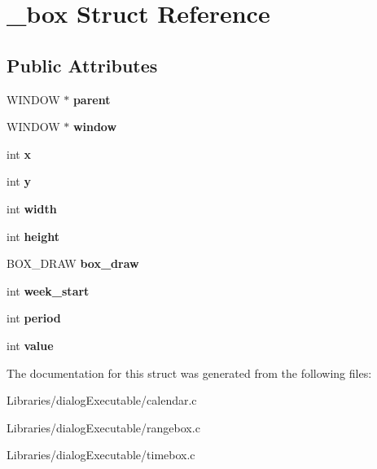 \hypertarget{struct__box}{}\section{\+\_\+box Struct Reference}
\label{struct__box}
\subsection*{Public Attributes}
\begin{DoxyCompactItemize}
\item 
W\+I\+N\+D\+OW $\ast$ {\bfseries parent}\hypertarget{struct__box_a31a06ad4a3eb0e5870d9f289661e4adc}{}\label{struct__box_a31a06ad4a3eb0e5870d9f289661e4adc}

\item 
W\+I\+N\+D\+OW $\ast$ {\bfseries window}\hypertarget{struct__box_af82d94fa8b77867b25801cd2cd933ff3}{}\label{struct__box_af82d94fa8b77867b25801cd2cd933ff3}

\item 
int {\bfseries x}\hypertarget{struct__box_ae40a9b37b6587721620da85255e1d84a}{}\label{struct__box_ae40a9b37b6587721620da85255e1d84a}

\item 
int {\bfseries y}\hypertarget{struct__box_aa0b25e97a846a412346cae4ca8219d0d}{}\label{struct__box_aa0b25e97a846a412346cae4ca8219d0d}

\item 
int {\bfseries width}\hypertarget{struct__box_a1a77dee766de46ca4032858b932fc135}{}\label{struct__box_a1a77dee766de46ca4032858b932fc135}

\item 
int {\bfseries height}\hypertarget{struct__box_a3a3232d1b518d9539b6f6e2b595cf8e6}{}\label{struct__box_a3a3232d1b518d9539b6f6e2b595cf8e6}

\item 
B\+O\+X\+\_\+\+D\+R\+AW {\bfseries box\+\_\+draw}\hypertarget{struct__box_ab0d062676108681e348c12d4892fb18c}{}\label{struct__box_ab0d062676108681e348c12d4892fb18c}

\item 
int {\bfseries week\+\_\+start}\hypertarget{struct__box_ad271fe24d6f9f0fcf4d0850adbfb821a}{}\label{struct__box_ad271fe24d6f9f0fcf4d0850adbfb821a}

\item 
int {\bfseries period}\hypertarget{struct__box_a2cb2a98abc4a4ac798381ca184fcdfc0}{}\label{struct__box_a2cb2a98abc4a4ac798381ca184fcdfc0}

\item 
int {\bfseries value}\hypertarget{struct__box_a226332fc1b1cc09ff75016a6963251ad}{}\label{struct__box_a226332fc1b1cc09ff75016a6963251ad}

\end{DoxyCompactItemize}


The documentation for this struct was generated from the following files\+:\begin{DoxyCompactItemize}
\item 
Libraries/dialog\+Executable/calendar.\+c\item 
Libraries/dialog\+Executable/rangebox.\+c\item 
Libraries/dialog\+Executable/timebox.\+c\end{DoxyCompactItemize}
